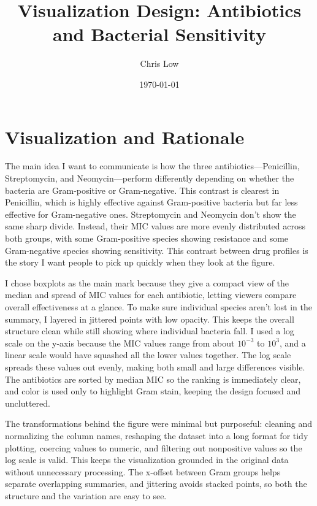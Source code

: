 \documentclass[12pt]{article}
\title{Visualization Design: Antibiotics and Bacterial Sensitivity}
\author{Chris Low}
\date{\today}
\begin{document}
\maketitle
\renewcommand{\baselinestretch}{1.2}\normalsize

\section*{Visualization and Rationale}

The main idea I want to communicate is how the three antibiotics—Penicillin, Streptomycin, and Neomycin—perform differently depending on whether the bacteria are Gram-positive or Gram-negative. This contrast is clearest in Penicillin, which is highly effective against Gram-positive bacteria but far less effective for Gram-negative ones. Streptomycin and Neomycin don’t show the same sharp divide. Instead, their MIC values are more evenly distributed across both groups, with some Gram-positive species showing resistance and some Gram-negative species showing sensitivity. This contrast between drug profiles is the story I want people to pick up quickly when they look at the figure.

I chose boxplots as the main mark because they give a compact view of the median and spread of MIC values for each antibiotic, letting viewers compare overall effectiveness at a glance. To make sure individual species aren’t lost in the summary, I layered in jittered points with low opacity. This keeps the overall structure clean while still showing where individual bacteria fall. I used a log scale on the y-axis because the MIC values range from about $10^{-3}$ to $10^{3}$, and a linear scale would have squashed all the lower values together. The log scale spreads these values out evenly, making both small and large differences visible. The antibiotics are sorted by median MIC so the ranking is immediately clear, and color is used only to highlight Gram stain, keeping the design focused and uncluttered.


The transformations behind the figure were minimal but purposeful: cleaning and normalizing the column names, reshaping the dataset into a long format for tidy plotting, coercing values to numeric, and filtering out nonpositive values so the log scale is valid. This keeps the visualization grounded in the original data without unnecessary processing. The x-offset between Gram groups helps separate overlapping summaries, and jittering avoids stacked points, so both the structure and the variation are easy to see.
\end{document}

